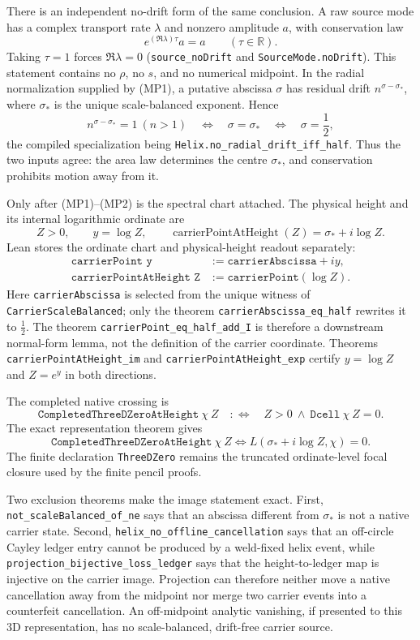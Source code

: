 There is an independent no-drift form of the same conclusion.  A raw
source mode has a complex transport rate \(\lambda\) and nonzero amplitude
\(a\), with conservation law
\[
  e^{(\Re\lambda)\tau}a=a\qquad(\tau\in\mathbb R).
\]
Taking \(\tau=1\) forces \(\Re\lambda=0\)
(\texttt{source\_noDrift} and \texttt{SourceMode.noDrift}).  This statement
contains no \(\rho\), no \(s\), and no numerical midpoint.  In the radial
normalization supplied by (MP1), a putative abscissa \(\sigma\) has residual
drift \(n^{\sigma-\sigma_*}\), where
\(\sigma_*\) is the unique scale-balanced exponent.  Hence
\[
  n^{\sigma-\sigma_*}=1\ (n>1)
  \quad\Longleftrightarrow\quad \sigma=\sigma_*
  \quad\Longleftrightarrow\quad \sigma=\frac12,
 \tag{MP2}\label{eq:grh-midpoint-drift}
\]
the compiled specialization being
\texttt{Helix.no\_radial\_drift\_iff\_half}.  Thus the two inputs agree:
the area law determines the centre \(\sigma_*\), and conservation prohibits
motion away from it.

Only after (MP1)--(MP2) is the spectral chart attached.  The physical height
and its internal logarithmic ordinate are
\[
 Z>0,\qquad y=\log Z,\qquad
 \operatorname{carrierPointAtHeight}(Z)=\sigma_*+i\log Z.
\]
Lean stores the ordinate chart and physical-height readout separately:
\[
\begin{aligned}
 \texttt{carrierPoint y}&:=\texttt{carrierAbscissa}+iy,\\
 \texttt{carrierPointAtHeight Z}&:=\texttt{carrierPoint}(\log Z).
\end{aligned}
\]
Here \texttt{carrierAbscissa} is selected from the unique witness of
\texttt{CarrierScaleBalanced}; only the theorem
\texttt{carrierAbscissa\_eq\_half} rewrites it to \(\tfrac12\).  The theorem
\texttt{carrierPoint\_eq\_half\_add\_I} is therefore a downstream normal-form
lemma, not the definition of the carrier coordinate.  Theorems
\texttt{carrierPointAtHeight\_im} and
\texttt{carrierPointAtHeight\_exp} certify $y=\log Z$ and
$Z=e^y$ in both directions.

The completed native crossing is
\[
\texttt{CompletedThreeDZeroAtHeight}\ \chi\ Z
 \quad:\Longleftrightarrow\quad
 Z>0\ \wedge\ \texttt{Dcell}\ \chi\ Z=0.
\]
The exact representation theorem gives
\[
 \texttt{CompletedThreeDZeroAtHeight}\ \chi\ Z
 \Longleftrightarrow
 L(\sigma_*+i\log Z,\chi)=0.
\]
The finite declaration \texttt{ThreeDZero} remains the truncated
ordinate-level focal closure used by the finite pencil proofs.

Two exclusion theorems make the image statement exact.  First,
\texttt{not\_scaleBalanced\_of\_ne} says that an abscissa different from
\(\sigma_*\) is not a native carrier state.  Second,
\texttt{helix\_no\_offline\_cancellation} says that an off-circle Cayley
ledger entry cannot be produced by a weld-fixed helix event, while
\texttt{projection\_bijective\_loss\_ledger} says that the height-to-ledger
map is injective on the carrier image.  Projection can therefore neither
move a native cancellation away from the midpoint nor merge two carrier
events into a counterfeit cancellation.  An off-midpoint analytic
vanishing, if presented to this 3D representation, has no scale-balanced,
drift-free carrier source.

